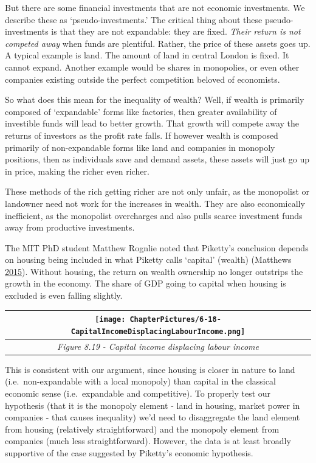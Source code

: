 \documentclass[]{tufte-handout}
\begin{document}
But there are some financial investments that are not economic
investments. We describe these as `pseudo-investments.' The critical
thing about these pseudo-investments is that they are not expandable:
they are fixed. \emph{Their return is not competed away} when funds are
plentiful. Rather, the price of these assets goes up. A typical example
is land. The amount of land in central London is fixed. It cannot
expand. Another example would be shares in monopolies, or even other
companies existing outside the perfect competition beloved of
economists.

So what does this mean for the inequality of wealth? Well, if wealth is
primarily composed of `expandable' forms like factories, then greater
availability of investible funds will lead to better growth. That growth
will compete away the returns of investors as the profit rate falls. If
however wealth is composed primarily of non-expandable forms like land
and companies in monopoly positions, then as individuals save and demand
assets, these assets will just go up in price, making the richer even
richer.

These methods of the rich getting richer are not only unfair, as the
monopolist or landowner need not work for the increases in wealth. They
are also economically inefficient, as the monopolist overcharges and
also pulls scarce investment funds away from productive investments.

The MIT PhD student Matthew Rognlie noted that Piketty's conclusion
depends on housing being included in what Piketty calls `capital'
(wealth) (Matthews \protect\hyperlink{ref-Matthews}{2015}). Without
housing, the return on wealth ownership no longer outstrips the growth
in the economy. The share of GDP going to capital when housing is
excluded is even falling slightly.

\begin{longtable}[]{@{}c@{}}
\toprule
\texttt{[image: ChapterPictures/6-18-CapitalIncomeDisplacingLabourIncome.png]}\tabularnewline
\midrule
\endhead
\emph{Figure 8.19 - Capital income displacing labour
income}\tabularnewline
\bottomrule
\end{longtable}

This is consistent with our argument, since housing is closer in nature
to land (i.e.~non-expandable with a local monopoly) than capital in the
classical economic sense (i.e.~expandable and competitive). To properly
test our hypothesis (that it is the monopoly element - land in housing,
market power in companies - that causes inequality) we'd need to
disaggregate the land element from housing (relatively straightforward)
and the monopoly element from companies (much less straightforward).
However, the data is at least broadly supportive of the case suggested
by Piketty's economic hypothesis.
\end{document}
